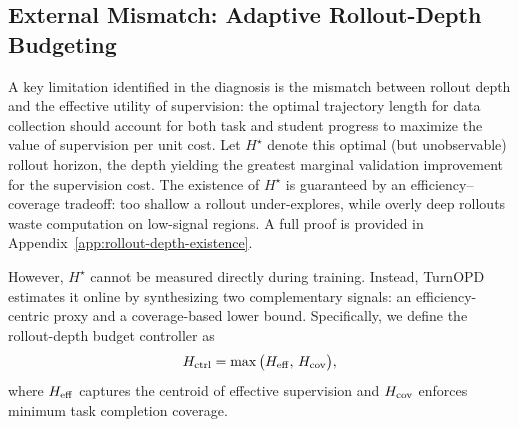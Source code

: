 

\subsection{External Mismatch: Adaptive Rollout-Depth Budgeting}
\label{sec:method:A}
A key limitation identified in the diagnosis is the mismatch between rollout depth and the effective utility of supervision: the optimal trajectory length for data collection should account for both task and student progress to maximize the value of supervision per unit cost. Let $H^\star$ denote this optimal (but unobservable) rollout horizon, the depth yielding the greatest marginal validation improvement for the supervision cost. The existence of $H^\star$ is guaranteed by an efficiency–coverage tradeoff: too shallow a rollout under-explores, while overly deep rollouts waste computation on low-signal regions. A full proof is provided in Appendix~\ref{app:rollout-depth-existence}.

However, $H^\star$ cannot be measured directly during training. Instead, TurnOPD estimates it online by synthesizing two complementary signals: an efficiency-centric proxy and a coverage-based lower bound. Specifically, we define the rollout-depth budget controller as
\begin{equation}
H_{\mathrm{ctrl}} = \max\big(H_{\mathrm{eff}},\, H_{\mathrm{cov}}\big),
\end{equation}
where $H_{\mathrm{eff}}$ captures the centroid of effective supervision and $H_{\mathrm{cov}}$ enforces minimum task completion coverage.

